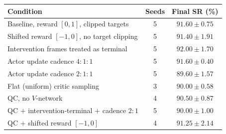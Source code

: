 \begin{tabular}{lcc}
\hline
Condition & Seeds & Final SR (\%) \\
\hline
Baseline, reward $[0,1]$, clipped targets & 5 & $91.60 \pm 0.75$ \\
Shifted reward $[-1,0]$, no target clipping & 5 & $91.40 \pm 1.91$ \\
Intervention frames treated as terminal & 5 & $92.00 \pm 1.70$ \\
Actor update cadence $4{:}1{:}1$ & 5 & $91.60 \pm 0.40$ \\
Actor update cadence $2{:}1{:}1$ & 5 & $89.60 \pm 1.57$ \\
Flat (uniform) critic sampling & 3 & $90.00 \pm 0.58$ \\
QC, no $V$-network & 4 & $90.50 \pm 0.87$ \\
QC $+$ intervention-terminal $+$ cadence $2{:}1$ & 5 & $90.00 \pm 1.00$ \\
QC $+$ shifted reward $[-1,0]$ & 4 & $91.25 \pm 2.14$ \\
\hline
\end{tabular}
